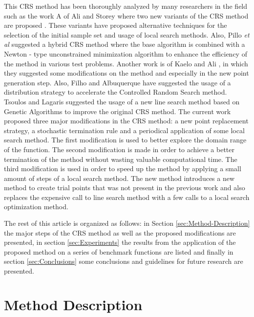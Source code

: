 \documentclass[symmetry,article,submit,moreauthors,pdftex]{Definitions/mdpi}
\begin{document}
This CRS method has been thoroughly analyzed by many researchers in
the field such as the work A of Ali and Storey where two new variants
of the CRS method are proposed \cite{crs_modif0}. These variants
have proposed alternative techniques for the selection of the initial
sample set and usage of local search methods. Also, Pillo \emph{et
al} \cite{crs_modif1} suggested a hybrid CRS method where the base
algorithm is combined with a Newton - type unconstrained minimization
algorithm \cite{crs_newton} to enhance the efficiency of the method
in various test problems. Another work is of Kaelo and Ali , in which
they suggested \cite{crs_modif2} some modifications on the method
and especially in the new point generation step. Also, Filho and Albuquerque
have suggested \cite{crs_modif3} the usage of a distribution strategy
to accelerate the Controlled Random Search method. Tsoulos and Lagaris \cite{TsoulosCRS} suggested the usage of a new line search method based on Genetic Algorithms to improve the original CRS method.  The current work
proposed three major modifications in the CRS method: a new point
replacement strategy, a stochastic termination rule and a periodical
application of some local search method. The first modification is
used to better explore the domain range of the function. The second
modification is made in order to achieve a better termination of the
method without wasting valuable computational time. The third modification
is used in order to speed up the method by applying a small amount
of steps of a local search method. The new method introduces a new method to create trial points that was not  present in the previous work \cite{TsoulosCRS} and also replaces the expensive call to line search method with a few calls to a local search optimization method.

The rest of this article is organized as follows:\textbf{ }in Section
\ref{sec:Method-Description} the major steps of the CRS method as
well as the proposed modifications are presented, in section \ref{sec:Experiments}
the results from the application of the proposed method on a series
of benchmark functions are listed and finally in section \ref{sec:Conclusions} 
some conclusions and guidelines for future research are  presented.

\section{Method Description \label{sec:Method-Description}}
\end{document}
